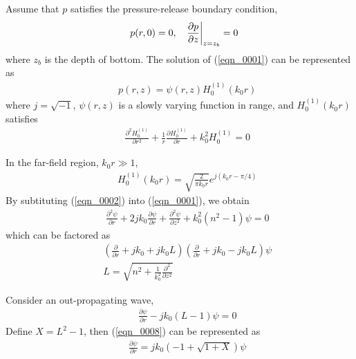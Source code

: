 \documentclass[journal,onecolumn]{IEEEtran}
\begin{document}
Assume that $p$ satisfies the pressure-release boundary condition, 
\begin{eqnarray}
&&p(r, 0) = 0, \hspace{0.3 cm} \left. \frac{\partial p}{\partial z} \right|_{z = z_b} = 0  
\label{eqn_00011}
\end{eqnarray}
where $z_b$ is the depth of bottom.
The solution of (\ref{eqn_0001}) can be represented as
\begin{eqnarray}
&&p(r, z) = \psi(r, z) H_0^{(1)}(k_0 r)
\label{eqn_0002} 
\end{eqnarray}
where $j = \sqrt{-1}$, $\psi(r, z)$ is a slowly varying function in range, and $H_0^{(1)}(k_0 r)$ satisfies
\begin{eqnarray}
&&\frac{\partial^2 H^{(1)}_0}{\partial r^2} + \frac{1}{r} \frac{\partial H^{(1)}_0}{\partial r} + k_0^2 H^{(1)}_0 = 0
\label{eqn_0003} 
\end{eqnarray}

In the far-field region, $k_0 r \gg 1$,
\begin{eqnarray}
&&H_0^{(1)}(k_0 r) = \sqrt{\frac{2}{\pi k_0 r}} e ^ {j (k_0 r - \pi / 4) }
\label{eqn_0004}
\end{eqnarray}
By subtituting (\ref{eqn_0002}) into (\ref{eqn_0001}), we obtain
\begin{eqnarray}
&&\frac{\partial^2 \psi}{\partial r} + 2 j k_0 \frac{\partial \psi}{\partial r} + \frac{\partial^2 \psi}{\partial z^2} 
+ k_0^2 (n^2 - 1) \psi = 0
\label{eqn_0005}
\end{eqnarray}
which can be factored as 
\begin{eqnarray}
&&\left(\frac{\partial }{\partial r} + j k_0 + j k_0 L \right) \left(\frac{\partial }{\partial r} + j k_0  - j k_0 L \right) \psi
\label{eqn_0006} \\
&&L = \sqrt{n^2 + \frac{1}{k_0^2} \frac{\partial^2}{\partial z^2}}
\label{eqn_0007}
\end{eqnarray}

Consider an out-propagating wave,
\begin{eqnarray}
&&\frac{\partial \psi }{\partial r} - j k_0 (L - 1) \psi = 0
\label{eqn_0008}
\end{eqnarray}
Define $X = L^2 - 1$, then (\ref{eqn_0008}) can be represented as
\begin{eqnarray}
&&\frac{\partial \psi}{\partial r} = j k_0 (-1 + \sqrt{1 + X}) \psi
\label{eqn_0009}
\end{eqnarray}
\end{document}
